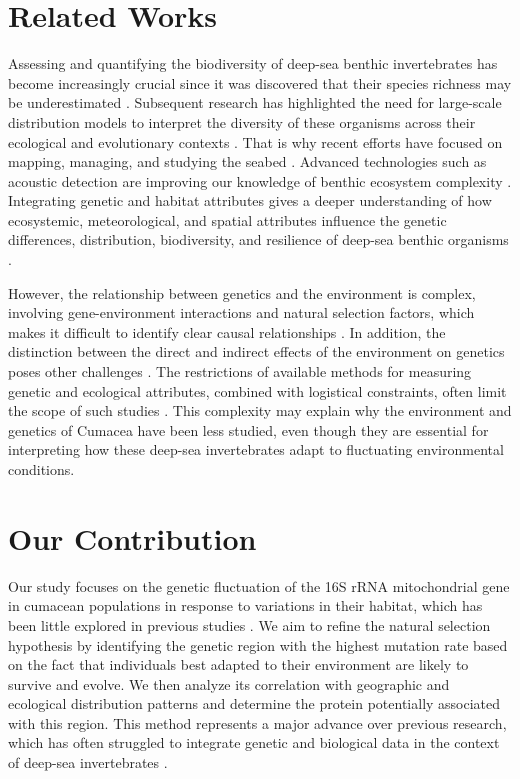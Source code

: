 \section{Related Works}\label{related-works}
Assessing and quantifying the biodiversity of deep-sea benthic invertebrates has become increasingly crucial since it was discovered that their species richness may be underestimated \citep{grassle1992deep}. Subsequent research has highlighted the need for large-scale distribution models to interpret the diversity of these organisms across their ecological and evolutionary contexts \citep{rex1997large}. That is why recent efforts have focused on mapping, managing, and studying the seabed \citep{brown2011benthic}. Advanced technologies such as acoustic detection are improving our knowledge of benthic ecosystem complexity \citep{brown2011benthic}. Integrating genetic and habitat attributes gives a deeper understanding of how ecosystemic, meteorological, and spatial attributes influence the genetic differences, distribution, biodiversity, and resilience of deep-sea benthic organisms \citep{vrijenhoek2009cryptic}.

However, the relationship between genetics and the environment is complex, involving gene-environment interactions and natural selection factors, which makes it difficult to identify clear causal relationships \citep{balkenhol_identifying_2009}. In addition, the distinction between the direct and indirect effects of the environment on genetics poses other challenges \citep{manel_perspectives_2010, balkenhol_landscape_2019}. The restrictions of available methods for measuring genetic and ecological attributes, combined with logistical constraints, often limit the scope of such studies \citep{manel_perspectives_2010, shafer_widespread_2013}. This complexity may explain why the environment and genetics of Cumacea have been less studied, even though they are essential for interpreting how these deep-sea invertebrates adapt to fluctuating environmental conditions.

\section{Our Contribution}\label{contribution}
Our study focuses on the genetic fluctuation of the 16S rRNA mitochondrial gene in cumacean populations in response to variations in their habitat, which has been little explored in previous studies \citep{grassle1992deep, rex2000latitudinal}. We aim to refine the natural selection hypothesis by identifying the genetic region with the highest mutation rate based on the fact that individuals best adapted to their environment are likely to survive and evolve. We then analyze its correlation with geographic and ecological distribution patterns and determine the protein potentially associated with this region. This method represents a major advance over previous research, which has often struggled to integrate genetic and biological data in the context of deep-sea invertebrates \citep{etter1990population, vrijenhoek2009cryptic}.

